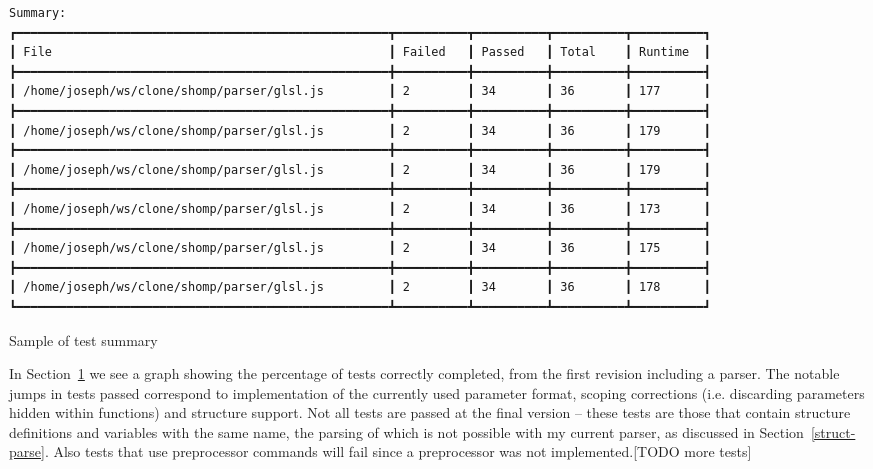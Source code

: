 \documentclass[12pt,twoside,notitlepage]{report}
\begin{document}
\begin{listing}[H]
\begin{verbatim}
Summary:
┏━━━━━━━━━━━━━━━━━━━━━━━━━━━━━━━━━━━━━━━━━━━━━━━━━━━━┳━━━━━━━━━━┳━━━━━━━━━━┳━━━━━━━━━━┳━━━━━━━━━━┓
┃ File                                               ┃ Failed   ┃ Passed   ┃ Total    ┃ Runtime  ┃
┣━━━━━━━━━━━━━━━━━━━━━━━━━━━━━━━━━━━━━━━━━━━━━━━━━━━━╋━━━━━━━━━━╋━━━━━━━━━━╋━━━━━━━━━━╋━━━━━━━━━━┫
┃ /home/joseph/ws/clone/shomp/parser/glsl.js         ┃ 2        ┃ 34       ┃ 36       ┃ 177      ┃
┣━━━━━━━━━━━━━━━━━━━━━━━━━━━━━━━━━━━━━━━━━━━━━━━━━━━━╋━━━━━━━━━━╋━━━━━━━━━━╋━━━━━━━━━━╋━━━━━━━━━━┫
┃ /home/joseph/ws/clone/shomp/parser/glsl.js         ┃ 2        ┃ 34       ┃ 36       ┃ 179      ┃
┣━━━━━━━━━━━━━━━━━━━━━━━━━━━━━━━━━━━━━━━━━━━━━━━━━━━━╋━━━━━━━━━━╋━━━━━━━━━━╋━━━━━━━━━━╋━━━━━━━━━━┫
┃ /home/joseph/ws/clone/shomp/parser/glsl.js         ┃ 2        ┃ 34       ┃ 36       ┃ 179      ┃
┣━━━━━━━━━━━━━━━━━━━━━━━━━━━━━━━━━━━━━━━━━━━━━━━━━━━━╋━━━━━━━━━━╋━━━━━━━━━━╋━━━━━━━━━━╋━━━━━━━━━━┫
┃ /home/joseph/ws/clone/shomp/parser/glsl.js         ┃ 2        ┃ 34       ┃ 36       ┃ 173      ┃
┣━━━━━━━━━━━━━━━━━━━━━━━━━━━━━━━━━━━━━━━━━━━━━━━━━━━━╋━━━━━━━━━━╋━━━━━━━━━━╋━━━━━━━━━━╋━━━━━━━━━━┫
┃ /home/joseph/ws/clone/shomp/parser/glsl.js         ┃ 2        ┃ 34       ┃ 36       ┃ 175      ┃
┣━━━━━━━━━━━━━━━━━━━━━━━━━━━━━━━━━━━━━━━━━━━━━━━━━━━━╋━━━━━━━━━━╋━━━━━━━━━━╋━━━━━━━━━━╋━━━━━━━━━━┫
┃ /home/joseph/ws/clone/shomp/parser/glsl.js         ┃ 2        ┃ 34       ┃ 36       ┃ 178      ┃
┗━━━━━━━━━━━━━━━━━━━━━━━━━━━━━━━━━━━━━━━━━━━━━━━━━━━━┻━━━━━━━━━━┻━━━━━━━━━━┻━━━━━━━━━━┻━━━━━━━━━━┛

\end{verbatim}
\caption{Sample of test summary\label{summary}}
\end{listing}
In Section~\ref{parser-git} we see a graph showing the percentage of tests correctly completed, from the first revision including a parser. The notable jumps in tests passed correspond to implementation of the currently used parameter format, scoping corrections (i.e. discarding parameters hidden within functions) and structure support. Not all tests are passed at the final version -- these tests are those that contain structure definitions and variables with the same name, the parsing of which is not possible with my current parser, as discussed in Section~\ref{struct-parse}. Also tests that use preprocessor commands will fail since a preprocessor was not implemented.[TODO more tests]

\begin{figure}
\label{parser-git}
\end{figure}
\end{document}
